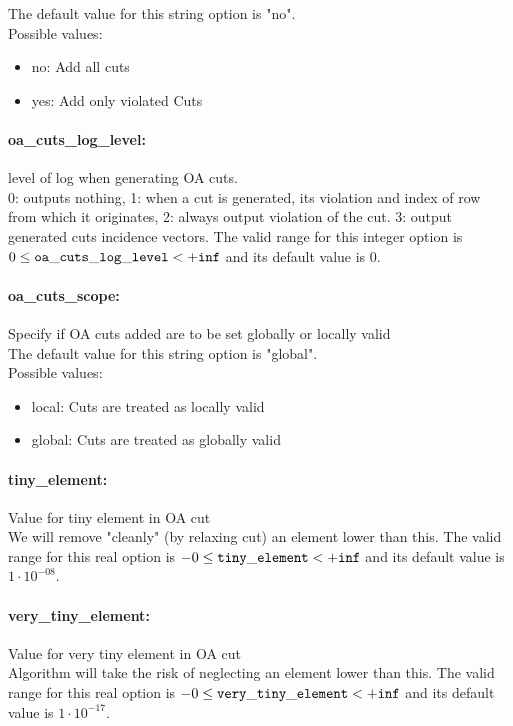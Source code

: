 The default value for this string option is "no".
\\ 
Possible values:
\begin{itemize}
   \item no: Add all cuts
   \item yes: Add only violated Cuts
\end{itemize}

\paragraph{\bf oa\_cuts\_log\_level:}\label{sec:oa_cuts_log_level} level of log when generating OA cuts. $\;$ \\
 0: outputs nothing,
1: when a cut is generated,
its violation and index of row from which it
originates,
2: always output violation of the
cut.
3: output generated cuts incidence vectors. The valid range for this integer option is
$0 \le {\tt oa\_cuts\_log\_level } <  {\tt +inf}$
and its default value is $0$.


\paragraph{\bf oa\_cuts\_scope:}\label{sec:oa_cuts_scope} Specify if OA cuts added are to be set globally or locally valid $\;$ \\

The default value for this string option is "global".
\\ 
Possible values:
\begin{itemize}
   \item local: Cuts are treated as locally valid
   \item global: Cuts are treated as globally valid
\end{itemize}

\paragraph{\bf tiny\_element:}\label{sec:tiny_element} Value for tiny element in OA cut $\;$ \\
 We will remove "cleanly" (by relaxing cut) an
element lower than this. The valid range for this real option is 
$-0 \le {\tt tiny\_element } <  {\tt +inf}$
and its default value is $1 \cdot 10^{-08}$.


\paragraph{\bf very\_tiny\_element:}\label{sec:very_tiny_element} Value for very tiny element in OA cut $\;$ \\
 Algorithm will take the risk of neglecting an
element lower than this. The valid range for this real option is 
$-0 \le {\tt very\_tiny\_element } <  {\tt +inf}$
and its default value is $1 \cdot 10^{-17}$.


